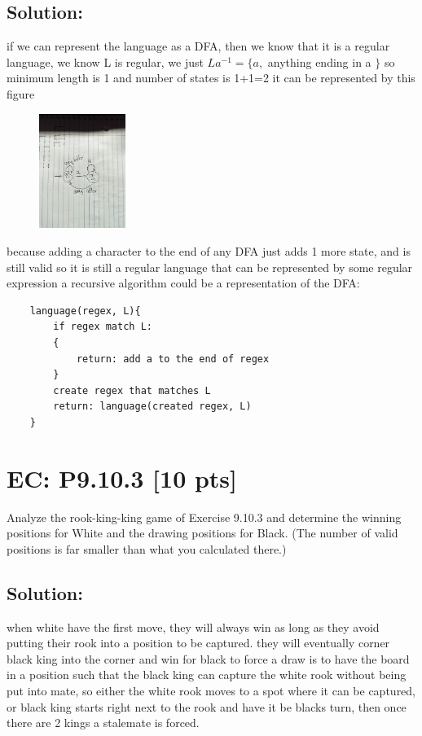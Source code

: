\documentclass[12pt]{article}
\begin{document}
\subsection*{\textbf{Solution:}}
if we can represent the language as a DFA, then we know that it is a regular language, we know L is regular, we just \newline
$La^{-1}=\{ a,$ anything ending in a $\}$ so minimum length is 1 and number of states is 1+1=2 it can be represented by this figure 
\begin{figure}[h]
    \centering
    \includegraphics[width=0.25\textwidth]{PXL_20240427_005457934.jpg}
\end{figure}
because adding a character to the end of any DFA just adds 1 more state, and is still valid so it is still a regular language that can be represented by some regular expression\newline
a recursive algorithm could be a representation of the DFA: \newline
\begin{verbatim}
    language(regex, L){
        if regex match L:
        {
            return: add a to the end of regex
        }
        create regex that matches L
        return: language(created regex, L)
    }

\end{verbatim}


\newpage


\section*{\textbf{EC: P9.10.3} [10 pts]}
Analyze the rook-king-king game of Exercise 9.10.3 and determine the winning positions for White and the drawing positions for Black. (The number of valid positions is far smaller than what you calculated there.)

\subsection*{\textbf{Solution:}}
when white have the first move, they will always win as long as they avoid putting their rook into a position to be captured. they will eventually corner black king into the corner and win\newline
for black to force a draw is to have the board in a position such that the black king can capture the white rook without being put into mate, so either the white rook moves to a spot where it can be captured, or black king starts right next to the rook and have it be blacks turn, then once there are 2 kings a stalemate is forced.
\end{document}
